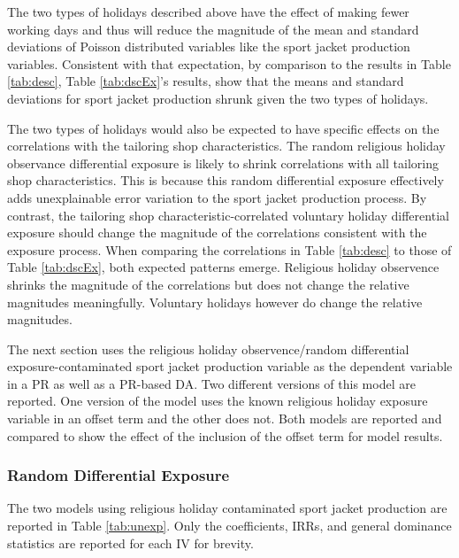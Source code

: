 \documentclass[ShortAfour,times,sageapa]{sagej}
\begin{document}
	The two types of holidays described above have the effect of making fewer working days and thus will reduce the magnitude of the mean and standard deviations of Poisson distributed variables like the sport jacket production variables.	
	Consistent with that expectation, by comparison to the results in Table \ref{tab:desc}, Table \ref{tab:dscEx}'s results, show that the means and standard deviations for sport jacket production shrunk given the two types of holidays.
	
	The two types of holidays would also be expected to have specific effects on the correlations with the tailoring shop characteristics.
	The random religious holiday observance differential exposure is likely to shrink correlations with all tailoring shop characteristics.
	This is because this random differential exposure effectively adds unexplainable error variation to the sport jacket production process.
	By contrast, the tailoring shop characteristic-correlated voluntary holiday differential exposure should change the magnitude of the correlations consistent with the exposure process.
	When comparing the correlations in Table \ref{tab:desc} to those of Table \ref{tab:dscEx}, both expected patterns emerge.
	Religious holiday observence shrinks the magnitude of the correlations but does not change the relative magnitudes meaningfully.
	Voluntary holidays however do change the relative magnitudes.
	
	The next section uses the religious holiday observence/random differential exposure-contaminated sport jacket production variable as the dependent variable in a PR as well as a PR-based DA.
	Two different versions of this model are reported.
	One version of the model uses the known religious holiday exposure variable in an offset term and the other does not.
	Both models are reported and compared to show the effect of the inclusion of the offset term for model results.
	
		\subsubsection{Random Differential Exposure}
		
	The two models using religious holiday contaminated sport jacket production are reported in Table \ref{tab:unexp}.
	Only the coefficients, IRRs, and general dominance statistics are reported for each IV for brevity.
		
\end{document}
